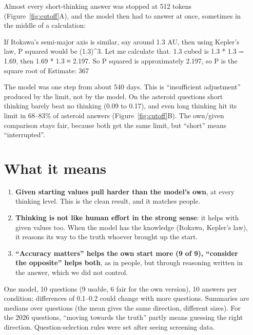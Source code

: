 \documentclass[11pt,a4paper]{article}
\begin{document}
Almost every short-thinking answer was stopped at 512 tokens (Figure~\ref{fig:cutoff}A), and the model then had to answer at once, sometimes in the middle of a calculation:
\begin{transcript}
\cut{} If Itokawa's semi-major axis is similar, say around 1.3 AU, then using Kepler's law, P squared would be (1.3)\^{}3. Let me calculate that. 1.3 cubed is 1.3 * 1.3 = 1.69, then 1.69 * 1.3 ≈ 2.197. So P squared is approximately 2.197, so P is the square root of
 Estimate: 367
\end{transcript}
The model was one step from about 540 days. This is \enquote{insufficient adjustment} produced by the limit, not by the model. On the asteroid questions short thinking barely beat no thinking (0.09 to 0.17), and even long thinking hit its limit in 68--83\% of asteroid answers (Figure~\ref{fig:cutoff}B). The own/given comparison stays fair, because both get the same limit, but \enquote{short} means \enquote{interrupted}.

\section{What it means}
\begin{enumerate}[leftmargin=*]
  \item \textbf{Given starting values pull harder than the model's own}, at every thinking level. This is the clean result, and it matches people.
  \item \textbf{Thinking is not like human effort in the strong sense}: it helps with given values too. When the model has the knowledge (Itokawa, Kepler's law), it reasons its way to the truth whoever brought up the start.
  \item \textbf{\enquote{Accuracy matters} helps the own start more (9 of 9), \enquote{consider the opposite} helps both}, as in people, but through reasoning written in the answer, which we did not control.
\end{enumerate}

\begin{cautionbox}[Limits.]
One model, 10 questions (9 usable, 6 fair for the own version), 10 answers per condition; differences of 0.1--0.2 could change with more questions. Summaries are medians over questions (the mean gives the same direction, different sizes). For the 2026 questions, \enquote{moving towards the truth} partly means guessing the right direction. Question-selection rules were set after seeing screening data.
\end{cautionbox}
\end{document}
